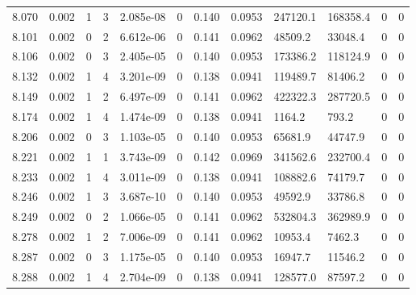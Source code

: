 \documentclass[preview]{standalone}
\begin{document}
{{{{{{{{{{{\begin{tabular}{L{1.2cm}C{1.2cm} C{0.3cm}C{0.5cm} C{1.4cm}C{1.4cm} C{1.4cm}C{1.4cm} C{1.6cm}C{1.6cm} C{1.6cm}C{1.6cm}}
  8.070  &  0.002  & 1     &  3 &  2.085e-08  & 0  &  0.140&   0.0953& 247120.1 & 168358.4   &  0 & 0  \\ 
  8.101  &  0.002  & 0     &  2 &  6.612e-06  & 0  &  0.141&   0.0962& 48509.2 & 33048.4   &  0 & 0  \\ 
  8.106  &  0.002  & 0     &  3 &  2.405e-05  & 0  &  0.140&   0.0953& 173386.2 & 118124.9   &  0 & 0  \\ 
  8.132  &  0.002  & 1     &  4 &  3.201e-09  & 0  &  0.138&   0.0941& 119489.7 & 81406.2   &  0 & 0  \\ 
  8.149  &  0.002  & 1     &  2 &  6.497e-09  & 0  &  0.141&   0.0962& 422322.3 & 287720.5   &  0 & 0  \\ 
  8.174  &  0.002  & 1     &  4 &  1.474e-09  & 0  &  0.138&   0.0941& 1164.2 & 793.2   &  0 & 0  \\ 
  8.206  &  0.002  & 0     &  3 &  1.103e-05  & 0  &  0.140&   0.0953& 65681.9 & 44747.9   &  0 & 0  \\ 
  8.221  &  0.002  & 1     &  1 &  3.743e-09  & 0  &  0.142&   0.0969& 341562.6 & 232700.4   &  0 & 0  \\ 
  8.233  &  0.002  & 1     &  4 &  3.011e-09  & 0  &  0.138&   0.0941& 108882.6 & 74179.7   &  0 & 0  \\ 
  8.246  &  0.002  & 1     &  3 &  3.687e-10  & 0  &  0.140&   0.0953& 49592.9 & 33786.8   &  0 & 0  \\ 
  8.249  &  0.002  & 0     &  2 &  1.066e-05  & 0  &  0.141&   0.0962& 532804.3 & 362989.9   &  0 & 0  \\ 
  8.278  &  0.002  & 1     &  2 &  7.006e-09  & 0  &  0.141&   0.0962& 10953.4 & 7462.3   &  0 & 0  \\ 
  8.287  &  0.002  & 0     &  3 &  1.175e-05  & 0  &  0.140&   0.0953& 16947.7 & 11546.2   &  0 & 0  \\ 
  8.288  &  0.002  & 1     &  4 &  2.704e-09  & 0  &  0.138&   0.0941& 128577.0 & 87597.2   &  0 & 0  \\ 
\hline 
\end{tabular} 

}}}}}}}}}}}
\end{document}
